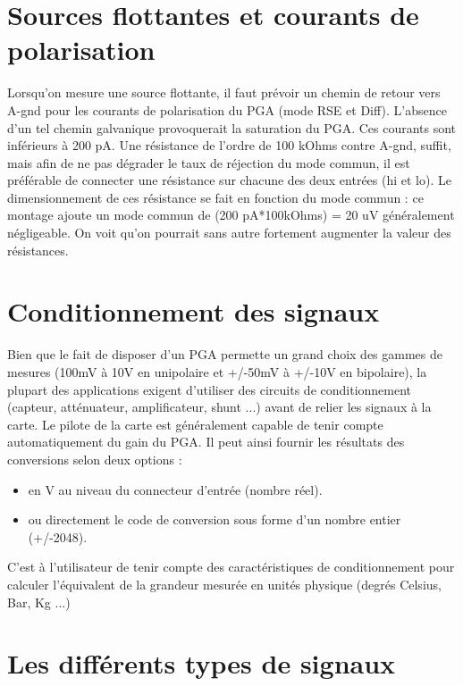 \newpage
\section{Sources flottantes et courants de polarisation}

Lorsqu'on mesure une source flottante, il faut prévoir un chemin de retour vers A-gnd pour les courants de polarisation du PGA (mode RSE et Diff). L'absence d'un tel chemin galvanique provoquerait la saturation du PGA. Ces courants sont inférieurs à 200 pA. Une résistance de l'ordre de 100 kOhms contre A-gnd, suffit, mais afin de ne pas dégrader le taux de réjection du mode commun, il est préférable de connecter une résistance sur chacune des deux entrées (hi et lo). Le dimensionnement de ces résistance se fait en fonction du mode commun : ce montage ajoute un mode commun de (200 pA*100kOhms) = 20 uV généralement négligeable. On voit qu'on pourrait sans autre fortement augmenter la valeur des résistances.

\section{Conditionnement des signaux}

Bien que le fait de disposer d'un PGA permette un grand choix des gammes de mesures (100mV à 10V en unipolaire et +/-50mV à +/-10V en bipolaire), la plupart des applications exigent d'utiliser des circuits de conditionnement  (capteur, atténuateur, amplificateur, shunt ...) avant de relier les signaux à la carte. Le pilote de la carte est généralement capable de tenir compte automatiquement du gain du PGA. Il peut ainsi fournir les résultats des conversions selon deux options :
\begin{itemize}\itemsep1pt
\renewcommand{\labelitemi}{$\bullet$}
\item en V au niveau du connecteur d'entrée (nombre réel).
\item ou directement le code de conversion sous forme d'un nombre entier (+/-2048).
\end{itemize}
C'est à l'utilisateur de tenir compte des caractéristiques de conditionnement pour calculer l'équivalent de la grandeur mesurée en unités physique (degrés Celsius, Bar, Kg ...)

\section{Les différents types de signaux}

